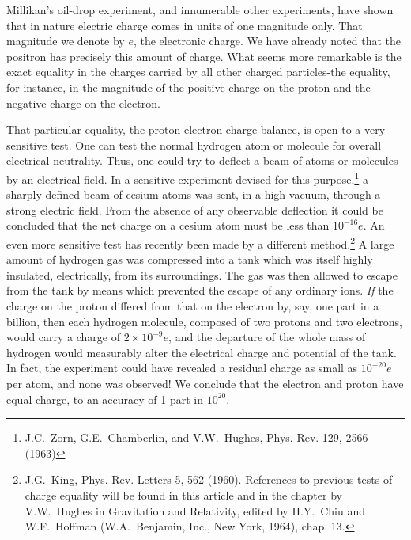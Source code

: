 Millikan's oil-drop experiment, and innumerable other
experiments, have shown that in nature electric charge comes in units of one
magnitude only. That magnitude we denote by $e$, the electronic charge. We have
already noted that the positron has precisely this amount of charge. What seems
more remarkable is the exact equality in the charges carried by all other
charged particles-the equality, for instance, in the magnitude of the positive
charge on the proton and the negative charge on the electron. 

That particular equality, the proton-electron charge
balance, is open to a very sensitive test. One can test the normal hydrogen
atom or molecule for overall electrical neutrality. Thus, one could try to
deflect a beam of atoms or molecules by an electrical field. In a sensitive
experiment devised for this purpose,\footnote{J.C.~Zorn, G.E.~Chamberlin,
and V.W.~Hughes, Phys. Rev. 129, 2566 (1963)} a sharply defined beam of cesium atoms was
sent, in a high vacuum, through a strong electric field. From the absence of
any observable deflection it could be concluded that the net charge on a cesium
atom must be less than $10^{-16}e$. An even more sensitive test has recently
been made by a different method.\footnote{J.G.~King, Phys. Rev. Letters 5, 562 (1960).
References to previous tests of charge equality will be found in this article and
in the chapter by V.W.~Hughes in Gravitation and Relativity, edited by H.Y.~Chiu and
W.F.~Hoffman (W.A.~Benjamin, Inc., New York, 1964), chap. 13.} A large amount of hydrogen gas was compressed
into a tank which was itself highly insulated, electrically, from its
surroundings. The gas was then allowed to escape from the tank by means which
prevented the escape of any ordinary ions. \emph{If} the charge on the proton
differed from that on the electron by, say, one part in a billion, then each
hydrogen molecule, composed of two protons and two electrons, would carry a
charge of $2\times 10^{-9}e$, and the departure of the whole mass of hydrogen would
measurably alter the electrical charge and potential of the tank. In fact, the
experiment could have revealed a residual charge as small as $10^{-20}e$ per
atom, and none was observed! We conclude that the electron and proton have
equal charge, to an accuracy of 1 part in $10^{20}$. 

